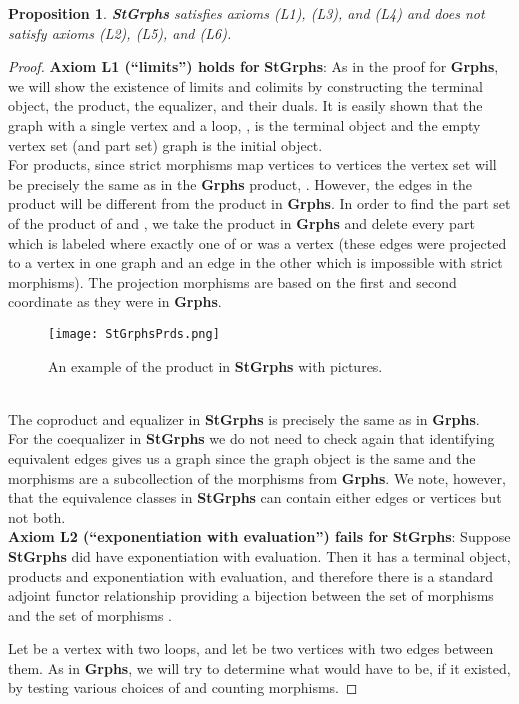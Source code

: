 \documentclass[11pt]{article}
\newtheorem{proposition}[theorem]{Proposition}
\begin{document}
\begin{proposition}
\textbf{StGrphs} satisfies axioms (L1), (L3), and (L4) and does not satisfy axioms (L2), (L5), and (L6).
\end{proposition}
\begin{proof}
\textbf{Axiom L1 (``limits'') holds for} \textbf{StGrphs}: As in the proof for \textbf{Grphs}, we will show the existence of limits and colimits by constructing the terminal object, the product, the equalizer, and their duals. It is easily shown that the graph with a single vertex and a loop, , is the terminal object and the empty vertex set (and part set) graph  is the initial object.\\
\indent For products, since strict morphisms map vertices to vertices the vertex set will be precisely the same as in the \textbf{Grphs} product, . However, the edges in the product will be different from the product in \textbf{Grphs}. In order to find the part set of the product of  and , we  take the product in \textbf{Grphs} and delete every part which is labeled  where exactly one of  or  was a vertex (these edges were projected to a vertex in one graph and an edge in the other which is impossible with strict morphisms). The projection morphisms are based on the first and second coordinate as they were in \textbf{Grphs}.
\begin{figure}[h]
\centering \texttt{[image: StGrphsPrds.png]}
\caption{An example of the product in \textbf{StGrphs} with pictures.}
\end{figure}\\
\indent The coproduct and equalizer in \textbf{StGrphs} is precisely the same as in \textbf{Grphs}.\\
\indent For the coequalizer in \textbf{StGrphs} we do not need to check again that identifying equivalent edges gives us a graph since the graph object is the same and the morphisms are a subcollection of the morphisms from \textbf{Grphs}. We note, however, that the equivalence classes in \textbf{StGrphs} can contain either edges or vertices but not both.\\
\indent \textbf{Axiom L2 (``exponentiation with evaluation'') fails for} \textbf{StGrphs}: Suppose \textbf{StGrphs} did have exponentiation with evaluation. Then it has a terminal object, products and exponentiation with evaluation, and therefore there is a standard adjoint functor relationship providing a bijection between the set of morphisms  and the set of morphisms .\par
Let  be a vertex with two loops, and let  be two vertices with two edges between them. As in \textbf{Grphs}, we will try to determine what  would have to be, if it existed, by testing various choices of  and counting morphisms.\par

\end{proof}
\end{document}

